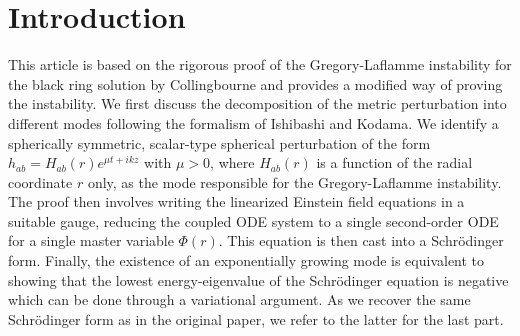 \documentclass[11pt,aip,jmp,amsmath,amssymb,draft]{revtex4-1}
\begin{document}
\section{\label{sec:intro}Introduction}
This article is based on the rigorous proof of the Gregory-Laflamme instability for the black ring solution by Collingbourne \cite{collingbourne2021gregory} and provides a modified way of proving the instability.
We first discuss the decomposition of the metric perturbation into different modes following the formalism of Ishibashi and Kodama. \cite{ishibashi2011perturbations}
We identify a spherically symmetric, scalar-type spherical perturbation of the form $h_{ab} = H_{ab}(r) e^{\mu t + ikz}$ with $\mu > 0$, where $H_{ab}(r)$ is a function of the radial coordinate $r$ only, as the mode responsible for the Gregory-Laflamme instability.
The proof then involves writing the linearized Einstein field equations in a suitable gauge, reducing the coupled ODE system to a single second-order ODE for a single master variable $\Phi(r)$. 
This equation is then cast into a Schr{\"o}dinger form.
Finally, the existence of an exponentially growing mode is equivalent to showing that the lowest energy-eigenvalue of the Schrödinger equation is negative which can be done through a variational argument. 
As we recover the same Schr{\"o}dinger form as in the original paper\cite{collingbourne2021gregory}, we refer to the latter for the last part.
\end{document}
